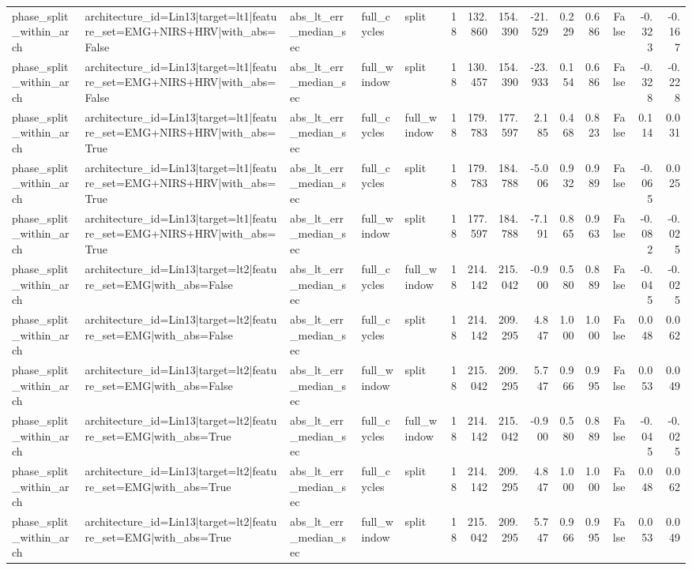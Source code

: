 \begin{table}
\begin{tabular}{lllllrrrrrrrrr}
phase_split_within_arch & architecture_id=Lin13|target=lt1|feature_set=EMG+NIRS+HRV|with_abs=False & abs_lt_err_median_sec & full_cycles & split & 18 & 132.860 & 154.390 & -21.529 & 0.229 & 0.686 & False & -0.323 & -0.167 \\
phase_split_within_arch & architecture_id=Lin13|target=lt1|feature_set=EMG+NIRS+HRV|with_abs=False & abs_lt_err_median_sec & full_window & split & 18 & 130.457 & 154.390 & -23.933 & 0.154 & 0.686 & False & -0.328 & -0.228 \\
phase_split_within_arch & architecture_id=Lin13|target=lt1|feature_set=EMG+NIRS+HRV|with_abs=True & abs_lt_err_median_sec & full_cycles & full_window & 18 & 179.783 & 177.597 & 2.185 & 0.468 & 0.823 & False & 0.114 & 0.031 \\
phase_split_within_arch & architecture_id=Lin13|target=lt1|feature_set=EMG+NIRS+HRV|with_abs=True & abs_lt_err_median_sec & full_cycles & split & 18 & 179.783 & 184.788 & -5.006 & 0.932 & 0.989 & False & -0.065 & 0.025 \\
phase_split_within_arch & architecture_id=Lin13|target=lt1|feature_set=EMG+NIRS+HRV|with_abs=True & abs_lt_err_median_sec & full_window & split & 18 & 177.597 & 184.788 & -7.191 & 0.865 & 0.963 & False & -0.082 & -0.025 \\
phase_split_within_arch & architecture_id=Lin13|target=lt2|feature_set=EMG|with_abs=False & abs_lt_err_median_sec & full_cycles & full_window & 18 & 214.142 & 215.042 & -0.900 & 0.580 & 0.889 & False & -0.045 & -0.025 \\
phase_split_within_arch & architecture_id=Lin13|target=lt2|feature_set=EMG|with_abs=False & abs_lt_err_median_sec & full_cycles & split & 18 & 214.142 & 209.295 & 4.847 & 1.000 & 1.000 & False & 0.048 & 0.062 \\
phase_split_within_arch & architecture_id=Lin13|target=lt2|feature_set=EMG|with_abs=False & abs_lt_err_median_sec & full_window & split & 18 & 215.042 & 209.295 & 5.747 & 0.966 & 0.995 & False & 0.053 & 0.049 \\
phase_split_within_arch & architecture_id=Lin13|target=lt2|feature_set=EMG|with_abs=True & abs_lt_err_median_sec & full_cycles & full_window & 18 & 214.142 & 215.042 & -0.900 & 0.580 & 0.889 & False & -0.045 & -0.025 \\
phase_split_within_arch & architecture_id=Lin13|target=lt2|feature_set=EMG|with_abs=True & abs_lt_err_median_sec & full_cycles & split & 18 & 214.142 & 209.295 & 4.847 & 1.000 & 1.000 & False & 0.048 & 0.062 \\
phase_split_within_arch & architecture_id=Lin13|target=lt2|feature_set=EMG|with_abs=True & abs_lt_err_median_sec & full_window & split & 18 & 215.042 & 209.295 & 5.747 & 0.966 & 0.995 & False & 0.053 & 0.049 \\

\end{tabular}
\end{table}
